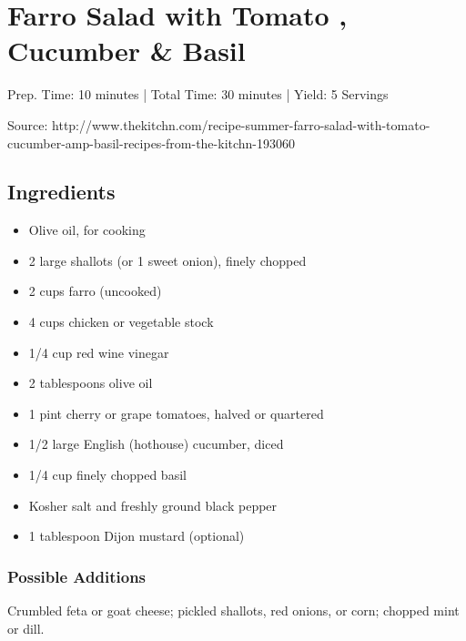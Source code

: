 \section{Farro Salad with Tomato , Cucumber \& Basil}

\begin{center}
\noindent Prep. Time: 10 minutes |
Total Time: 30 minutes | 
Yield: 5 Servings

\vspace{1em}

Source: http://www.thekitchn.com/recipe-summer-farro-salad-with-tomato-cucumber-amp-basil-recipes-from-the-kitchn-193060
\end{center}

\subsection{Ingredients}
\begin{multicols}{2}
\begin{itemize}
    \item Olive oil, for cooking
    \item 2 large shallots (or 1 sweet onion), finely chopped
    \item 2 cups farro (uncooked)
    \item 4 cups chicken or vegetable stock
    \item 1/4 cup red wine vinegar
    \item 2 tablespoons olive oil
    \item 1 pint cherry or grape tomatoes, halved or quartered
    \item 1/2 large English (hothouse) cucumber, diced
    \item 1/4 cup finely chopped basil
    \item Kosher salt and freshly ground black pepper
    \item 1 tablespoon Dijon mustard (optional)
\end{itemize}
\end{multicols}

\subsubsection{Possible Additions}
Crumbled feta or goat cheese; pickled shallots, red onions, or corn; chopped mint or dill.

